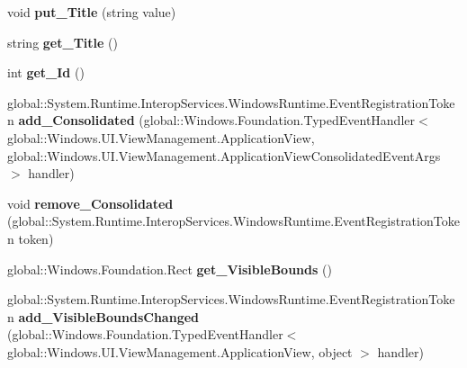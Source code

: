 \begin{DoxyCompactItemize}
void {\bfseries put\+\_\+\+Title} (string value)
\item 
\mbox{\label{class_windows_1_1_u_i_1_1_view_management_1_1_application_view_a08cf5cd5b2e28afa51bc13468334352a}} 
string {\bfseries get\+\_\+\+Title} ()
\item 
\mbox{\label{class_windows_1_1_u_i_1_1_view_management_1_1_application_view_a4327352f99894f72219cfb4cad222952}} 
int {\bfseries get\+\_\+\+Id} ()
\item 
\mbox{\label{class_windows_1_1_u_i_1_1_view_management_1_1_application_view_a0ffeec110a4a66c247c6e2a9b4be797b}} 
global\+::\+System.\+Runtime.\+Interop\+Services.\+Windows\+Runtime.\+Event\+Registration\+Token {\bfseries add\+\_\+\+Consolidated} (global\+::\+Windows.\+Foundation.\+Typed\+Event\+Handler$<$ global\+::\+Windows.\+U\+I.\+View\+Management.\+Application\+View, global\+::\+Windows.\+U\+I.\+View\+Management.\+Application\+View\+Consolidated\+Event\+Args $>$ handler)
\item 
\mbox{\label{class_windows_1_1_u_i_1_1_view_management_1_1_application_view_a1c5d2a3b58064582c6456f48994b44d6}} 
void {\bfseries remove\+\_\+\+Consolidated} (global\+::\+System.\+Runtime.\+Interop\+Services.\+Windows\+Runtime.\+Event\+Registration\+Token token)
\item 
\mbox{\label{class_windows_1_1_u_i_1_1_view_management_1_1_application_view_aee267cf0554bac921b2c6c10392310b7}} 
global\+::\+Windows.\+Foundation.\+Rect {\bfseries get\+\_\+\+Visible\+Bounds} ()
\item 
\mbox{\label{class_windows_1_1_u_i_1_1_view_management_1_1_application_view_a1a4e9c3942d4eb2602fdeb123ed6f77a}} 
global\+::\+System.\+Runtime.\+Interop\+Services.\+Windows\+Runtime.\+Event\+Registration\+Token {\bfseries add\+\_\+\+Visible\+Bounds\+Changed} (global\+::\+Windows.\+Foundation.\+Typed\+Event\+Handler$<$ global\+::\+Windows.\+U\+I.\+View\+Management.\+Application\+View, object $>$ handler)

\end{DoxyCompactItemize}

